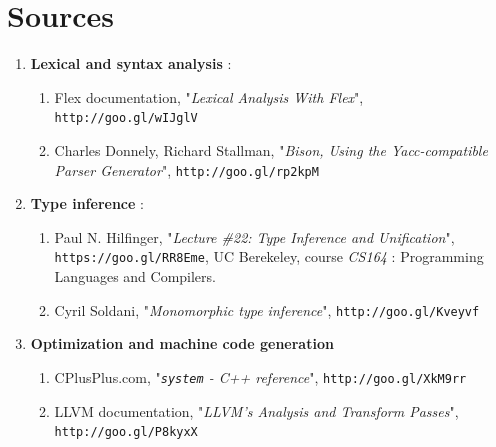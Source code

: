 \documentclass[a4paper,11pt]{article}
\begin{document}
\section{Sources}
\begin{enumerate}
	\item \textbf{Lexical and syntax analysis} :
	\begin{enumerate}
		\item\label{enum:flex_ref} Flex documentation, "\textit{Lexical Analysis With Flex}", \texttt{http://goo.gl/wIJglV}
		\item\label{enum:bison_ref} Charles Donnely, Richard Stallman, "\textit{Bison, Using the Yacc-compatible Parser Generator}", \texttt{http://goo.gl/rp2kpM}
	\end{enumerate}
	\item \textbf{Type inference} :
	\begin{enumerate}
		\item\label{enum:inference_unification} Paul N. Hilfinger, "\textit{Lecture \#22: Type Inference and Unification}", \texttt{https://goo.gl/RR8Eme}, UC Berekeley, course \textit{CS164} : Programming Languages and Compilers.
		\item\label{enum:inference_photon} Cyril Soldani, "\textit{Monomorphic type inference}", \texttt{http://goo.gl/Kveyvf}
	\end{enumerate}
	\item \textbf{Optimization and machine code generation}
	\begin{enumerate}
		\item\label{enum:system_cmd_proc} CPlusPlus.com, "\textit{\texttt{system} - C++ reference}", \texttt{http://goo.gl/XkM9rr}
		\item\label{enum:opt_passes} LLVM documentation, "\textit{LLVM’s Analysis and Transform Passes}", \texttt{http://goo.gl/P8kyxX}
	\end{enumerate}
\end{enumerate}
\end{document}
